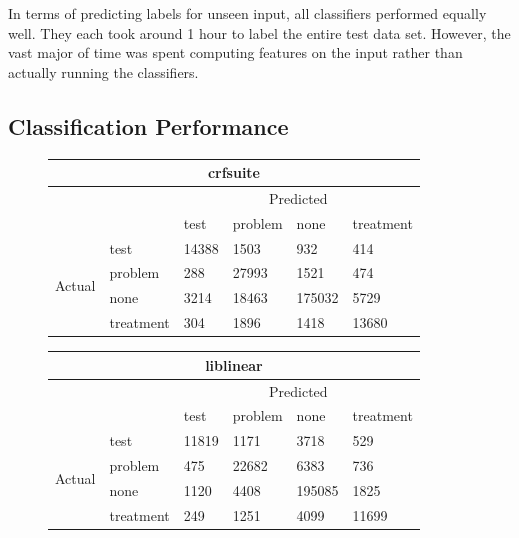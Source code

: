\documentclass[preprint]{style}
\begin{document}
In terms of predicting labels for unseen input, all classifiers performed equally well. They each took around 1 hour to label the entire test data set. However, the vast major of time was spent computing features on the input rather than actually running the classifiers.

\subsection{Classification Performance}

\begin{figure}[t]
\begin{center}
	\begin{tabular}{|l|l|l|l|l|l|}
	\hline
	\multicolumn{6}{|c|}{\bf crfsuite} \\ \hline
	& & \multicolumn{4}{|c|}{Predicted} \\ \hline
	& & test & problem & none & treatment \\ \hline
	\multirow{4}{*}{\begin{sideways}Actual\end{sideways}}
		& test & 14388 & 1503 & 932 & 414	\\ \hline
		& problem & 288 & 27993 & 1521 & 474	\\ \hline
		& none & 3214 & 18463 & 175032 & 5729	\\ \hline
		& treatment & 304 & 1896 & 1418 & 13680	\\ \hline

	\end{tabular}
\end{center}

\begin{center}
	\begin{tabular}{|l|l|l|l|l|l|}
	\hline
	\multicolumn{6}{|c|}{\bf liblinear} \\ \hline
	& & \multicolumn{4}{|c|}{Predicted} \\ \hline
	& & test & problem & none & treatment \\ \hline
	\multirow{4}{*}{\begin{sideways}Actual\end{sideways}}
		& test & 11819 & 1171 & 3718 & 529	\\ \hline
		& problem & 475 & 22682 & 6383 & 736	\\ \hline
		& none & 1120 & 4408 & 195085 & 1825	\\ \hline
		& treatment & 249 & 1251 & 4099 & 11699	\\ \hline


\end{tabular}
\end{center}
\end{figure}
\end{document}
